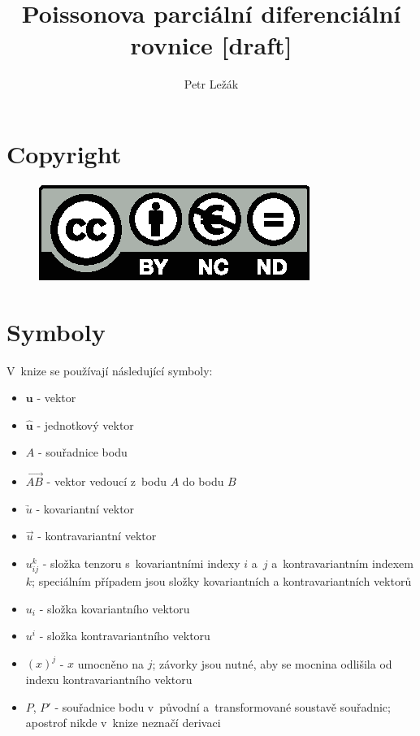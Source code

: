 \documentclass{book}
\title{Poissonova parciální diferenciální rovnice [draft]}
\author{Petr Ležák}
\newcommand{\vect}[1]{\boldsymbol{#1}}
\newcommand{\unitvect}[1]{\hat{\boldsymbol{#1}}}
\newcommand{\vectpoints}[1]{\overrightarrow{#1}}
\newcommand{\kovarvect}[1]{\underrightarrow{#1}}
\newcommand{\kontravect}[1]{\overrightarrow{#1}}
\begin{document}
\maketitle

\chapter{Copyright}



\begin{figure}
	\includegraphics{pic/by-nc-nd-eu.eps}
\end{figure}

\chapter{Symboly}

V~knize se používají následující symboly:
\begin{itemize}
\item \(\vect{u}\) - vektor
\item \(\unitvect{u}\) - jednotkový vektor
\item \(A\) - souřadnice bodu
\item \(\vectpoints{AB}\) - vektor vedoucí z~bodu \(A\) do bodu \(B\)
\item \(\kovarvect{u}\) - kovariantní vektor
\item \(\kontravect{u}\) - kontravariantní vektor
\item \(u_{ij}^k\) - složka tenzoru s~kovariantními indexy \(i\) a~\(j\) a~kontravariantním indexem \(k\); speciálním případem jsou složky kovariantních a kontravariantních vektorů
\item \(u_i\) - složka kovariantního vektoru
\item \(u^i\) - složka kontravariantního vektoru
\item \((x)^j\) - \(x\) umocněno na \(j\); závorky jsou nutné, aby se mocnina odlišila od indexu kontravariantního vektoru
\item \(P\), \(P'\) - souřadnice bodu v~původní a~transformované soustavě souřadnic; apostrof nikde v~knize neznačí derivaci
\end{itemize}
\end{document}

